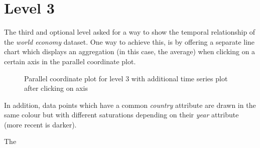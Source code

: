 \documentclass[]{article}
\begin{document}
\section*{Level 3}
The third and optional level asked for a way to show the temporal relationship of the \emph{world economy} dataset. One way to achieve this, is by offering a separate line chart which displays an aggregation (in this case, the average) when clicking on a certain axis in the parallel coordinate plot. 

\begin{figure}[t]
	
	\centering
	\caption{Parallel coordinate plot for level 3 with additional time series plot after clicking on axis}
\end{figure}

In addition, data points which have a common \emph{country} attribute are drawn in the same colour but with different saturations depending on their \emph{year} attribute (more recent is darker). 

The  
\end{document}
